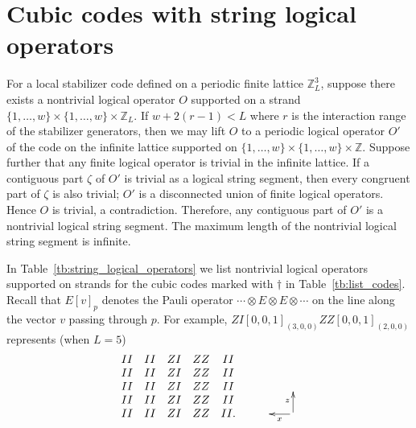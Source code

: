 \documentclass[letterpaper,10pt,pra,aps,showpacs,twocolumn]{revtex4-1}
\theoremstyle{definition} \newtheorem{defn}{Definition}
\theoremstyle{definition} \newtheorem{remark}{Remark}
\begin{document}
\section{Cubic codes with string logical operators}
\label{section:codes_w_string_logical_operators}

For a local stabilizer code defined on a periodic finite lattice $\mathbb{Z}_L^3$, suppose there exists a nontrivial logical operator $O$ supported on a strand $\{1,\ldots,w\} \times \{1,\ldots,w\} \times \mathbb{Z}_L$. If $w+2(r-1) < L$ where $r$ is the interaction range of the stabilizer generators, then we may lift $O$ to a periodic logical operator $O'$ of the code on the infinite lattice supported on $\{1,\ldots,w\} \times \{1,\ldots,w\} \times \mathbb{Z}$. Suppose further that any finite logical operator is trivial in the infinite lattice.
If a contiguous part $\zeta$ of $O'$ is trivial as a logical string segment, then every congruent part of $\zeta$ is also trivial; $O'$ is a disconnected union of finite logical operators. Hence $O$ is trivial, a contradiction. Therefore, any contiguous part of $O'$ is a nontrivial logical string segment. The maximum length of the nontrivial logical string segment is infinite.

In Table~\ref{tb:string_logical_operators} we list nontrivial logical operators supported on strands for the cubic codes marked with $\dagger$ in Table~\ref{tb:list_codes}. Recall that $E[v]_p$ denotes the Pauli operator $\cdots \otimes E \otimes E \otimes \cdots$ on the line along the vector $v$ passing through $p$. For example, $ZI[0,0,1]_{(3,0,0)} ZZ[0,0,1]_{(2,0,0)}$ represents (when $L=5$)
\[
 \begin{matrix}
II & II & ZI & ZZ & II \\
II & II & ZI & ZZ & II \\
II & II & ZI & ZZ & II \\
II & II & ZI & ZZ & II \\
II & II & ZI & ZZ & II .
\end{matrix}
\xymatrix@!0{
&  & \\
&  & \ar[l]^x \ar[u]^z
}
\]
\end{document}
